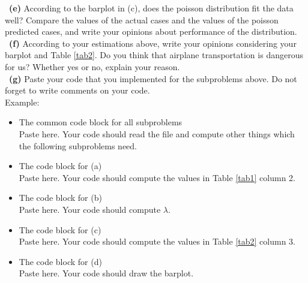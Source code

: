 \documentclass[a4 paper]{article}
\numberwithin{equation}{section}
\newcommand{\subproblem}[1]{~\newline\textbf{(#1)}}
\newcommand{\0}{\mathbf{0}}
\begin{document}
\subproblem{e} According to the barplot in (c), does the poisson distribution fit the data well? Compare the values of the actual cases and the values of the poisson predicted cases, and write your opinions about performance of the distribution.\\

\subproblem{f} According to your estimations above, write your opinions considering your barplot and Table \ref{tab2}. Do you think that airplane transportation is dangerous for us? Whether yes or no, explain your reason.\\

\subproblem{g} Paste your code that you implemented for the subproblems above. Do not forget to write comments on your code.\\
Example:\\
\begin{itemize}
	\item The common code block for all subproblems\\
	Paste here. Your code should read the file and compute other things which the following subproblems need.
	\item The code block for (a)\\
	Paste here. Your code should compute the values in Table \ref{tab1} column 2.
	\item The code block for (b)\\
	Paste here. Your code should compute $\lambda$.
	\item The code block for (c)\\
	Paste here. Your code should compute the values in Table \ref{tab2} column 3. 
	\item The code block for (d)\\
	Paste here. Your code should draw the barplot.
\end{itemize}
\end{document}
